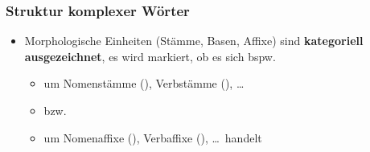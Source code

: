 \begin{frame}
\frametitle{Struktur komplexer Wörter}

\begin{minipage}{0.65\textwidth}
\begin{itemize}
	\item Morphologische Einheiten (Stämme, Basen, Affixe) sind \textbf{kategoriell ausgezeichnet}, \dash es wird markiert, ob es sich bspw. 
	
	\begin{itemize}
		\item um Nomenstämme (), Verbstämme (), \ldots 
		\item[] bzw.
		\item um Nomenaffixe (), Verbaffixe (), \ldots\  handelt
	\end{itemize}
\end{itemize}
\end{minipage}
%
\hfill%
%
\begin{minipage}{.34\textwidth}

\begin{figure}	
\centering
{}

\vspace{.5cm}

\centering
{}
\end{figure}
\end{minipage}
\end{frame}


